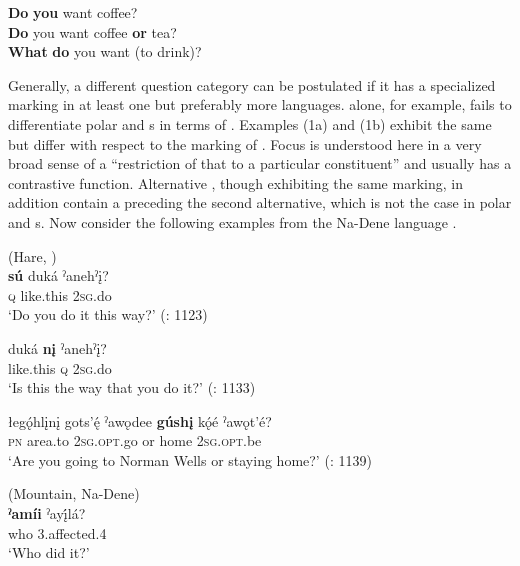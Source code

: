     \ex
      \textbf{{Do}} \textbf{you} want coffee?\\

    \ex
      \textbf{{Do}} you want coffee \textbf{{or}} tea?\\

    \ex
      \textbf{{What}} \textbf{{do}} you want (to drink)?\\
    \z
    \z 

\noindent Generally, a different question category can be postulated if it has a specialized marking in at least one but preferably more languages.  alone, for example, fails to differentiate polar and s in terms of . Examples (1a) and (1b) exhibit the same  but differ with respect to the marking of . Focus is understood here in a very broad sense of a “restriction of that  to a particular constituent” \citep[246]{Bhat2004} and usually has a contrastive function. Alternative , though exhibiting the same marking, in addition contain a  preceding the second alternative, which is not the case in polar and s. Now consider the following examples from the Na-Dene language .

\ea%
    \label{ex:4:2}
     (Hare, )\\
    \ea
    \gll \textbf{{sú}} duká    ˀanehˀ\k{i}?\\
    \textsc{q}  like.this  2\textsc{sg}.do\\
    \glt ‘Do you do it this way?’ (\citealt{Rice1989}: 1123)
    
    \ex
    \gll duká \textbf{{n\k{i}}} {ˀanehˀ\k{i}?}\\
    like.this  \textsc{q}  2\textsc{sg}.do\\
    \glt ‘Is this the way that you do it?’ (\citealt{Rice1989}: 1133)

    \ex
    \gll łegǫ́hl\k{i}n\k{i}  gots’\'{ę}  ˀawǫdee \textbf{{gúsh\k{i}}} kǫ́é  ˀawǫt’é?\\
    \textsc{pn}    area.to  2\textsc{sg.opt}.go  or  home  2\textsc{sg}.\textsc{opt}.be\\
    \glt ‘Are you going to Norman Wells or staying home?’ (\citealt{Rice1989}: 1139)

    \ex {} (Mountain, Na-Dene)\\
    \gll \textbf{{ˀamíi}} {ˀay\'{\k{i}}}{lá?}\\
    who  3.affected.4\\
    \glt ‘Who did it?’ \citep[1141]{Rice1989}
    \z
    \z 

